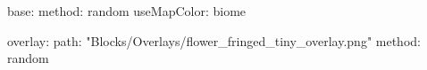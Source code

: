 base:
  method: random
  useMapColor: biome
  
overlay:
  path: "Blocks/Overlays/flower_fringed_tiny_overlay.png"
  method: random